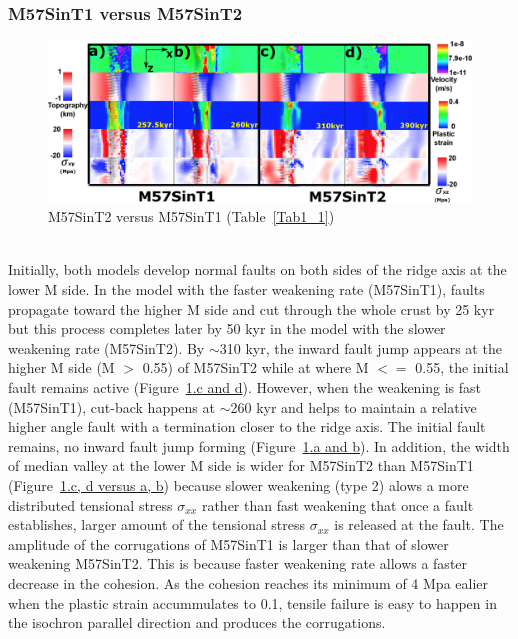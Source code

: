 \subsubsection{M57SinT1 versus M57SinT2}

\begin{figure}[h]
 \centering
  \includegraphics[width=1.0\textwidth]{./Figures/fig_Results_Weakening_2_M57SinT1VST2_CutbackVSsecondaryFault.eps}
 \caption{M57SinT2 versus M57SinT1 (Table~\hyperref[Tab1_1]{\ref{Tab1_1}})}
\label{fig_Results_Weakenging_2}
\end{figure}
~\\
Initially, both models develop normal faults on both sides of the ridge axis at the lower M side. In the model with the faster weakening rate (M57SinT1), faults propagate toward the higher M side and cut through the whole crust by 25 kyr but this process completes later by 50 kyr in the model with the slower weakening rate (M57SinT2). By $\sim$310 kyr, the inward fault jump appears at the higher M side (M $>$ 0.55) of M57SinT2 while at where M $<=$ 0.55, the initial fault remains active (Figure~\hyperref[fig_Results_Weakenging_2]{\ref{fig_Results_Weakenging_2}.c and d}). However, when the weakening is fast (M57SinT1), cut-back happens at $\sim$260 kyr and helps to maintain a relative higher angle fault with a termination closer to the ridge axis. The initial fault remains, no inward fault jump forming (Figure~\hyperref[fig_Results_Weakenging_2]{\ref{fig_Results_Weakenging_2}.a and b}). In addition, the width of median valley at the lower M side is wider for M57SinT2 than M57SinT1 (Figure~\hyperref[fig_Results_Weakenging_2]{\ref{fig_Results_Weakenging_2}.c, d versus a, b}) because slower weakening (type 2) alows a more distributed tensional stress $\sigma_{xx}$ rather than fast weakening that once a fault establishes, larger amount of the tensional stress $\sigma_{xx}$ is released at the fault. The amplitude of the corrugations of M57SinT1 is larger than that of slower weakening M57SinT2. This is because faster weakening rate allows a faster decrease in the cohesion. As the cohesion reaches its minimum of 4 Mpa ealier when the plastic strain accummulates to 0.1, tensile failure is easy to happen in the isochron parallel direction and produces the corrugations.  


